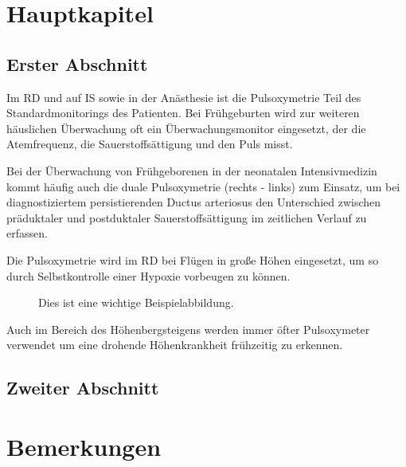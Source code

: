 \chapter{Hauptkapitel}


\section{Erster Abschnitt}



Im \ac{RD} und auf \ac{IS} sowie in der Anästhesie  ist die Pulsoxymetrie Teil des Standardmonitorings des Patienten. Bei Frühgeburten wird zur weiteren häuslichen Überwachung oft ein Überwachungsmonitor eingesetzt, der die Atemfrequenz, die Sauerstoffsättigung und den Puls misst.

Bei der Überwachung von Frühgeborenen in der neonatalen Intensivmedizin kommt häufig auch die duale Pulsoxymetrie (rechts - links) zum Einsatz, um bei diagnostiziertem persistierenden Ductus arteriosus den Unterschied zwischen präduktaler und postduktaler Sauerstoffsättigung im zeitlichen Verlauf zu erfassen.

Die Pulsoxymetrie%
 wird im \ac{RD} bei Flügen in große Höhen eingesetzt, um so durch Selbstkontrolle einer Hypoxie vorbeugen zu können.

\begin{figure}
	\centering
	\caption{Dies ist eine wichtige Beispielabbildung.}
	\label{fig:bsp}
\end{figure}


Auch im Bereich des Höhenbergsteigens werden immer öfter Pulsoxymeter verwendet um eine drohende Höhenkrankheit frühzeitig zu erkennen.


\section{Zweiter Abschnitt}


\lipsum[3-4]


\chapter{Bemerkungen}


\lipsum[5]


